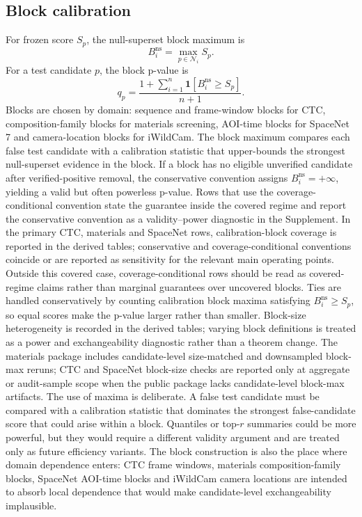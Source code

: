 \documentclass[10pt,twocolumn]{article}
\newcommand{\Ncal}{\mathcal N}
\newcommand{\ind}{\mathbf 1}
\begin{document}
\subsection{Block calibration}

For frozen score \(S_p\), the null-superset block maximum is
\[
  B_i^{\mathrm{ns}}=\max_{p\in\Ncal_i}S_p .
\]
For a test candidate \(p\), the block p-value is
\[
  q_p=\frac{1+\sum_{i=1}^n\ind[B_i^{\mathrm{ns}}\ge S_p]}{n+1}.
\]
Blocks are chosen by domain: sequence and frame-window blocks for CTC, composition-family blocks for materials screening, AOI-time blocks for SpaceNet 7 and camera-location blocks for iWildCam.
The block maximum compares each false test candidate with a calibration statistic that upper-bounds the strongest null-superset evidence in the block.
If a block has no eligible unverified candidate after verified-positive removal, the conservative convention assigns \(B_i^{\mathrm{ns}}=+\infty\), yielding a valid but often powerless p-value.
Rows that use the coverage-conditional convention state the guarantee inside the covered regime and report the conservative convention as a validity--power diagnostic in the Supplement.
In the primary CTC, materials and SpaceNet rows, calibration-block coverage is reported in the derived tables; conservative and coverage-conditional conventions coincide or are reported as sensitivity for the relevant main operating points.
Outside this covered case, coverage-conditional rows should be read as covered-regime claims rather than marginal guarantees over uncovered blocks.
Ties are handled conservatively by counting calibration block maxima satisfying \(B_i^{\mathrm{ns}}\ge S_p\), so equal scores make the p-value larger rather than smaller.
Block-size heterogeneity is recorded in the derived tables; varying block definitions is treated as a power and exchangeability diagnostic rather than a theorem change.
The materials package includes candidate-level size-matched and downsampled block-max reruns; CTC and SpaceNet block-size checks are reported only at aggregate or audit-sample scope when the public package lacks candidate-level block-max artifacts.
The use of maxima is deliberate.
A false test candidate must be compared with a calibration statistic that dominates the strongest false-candidate score that could arise within a block.
Quantiles or top-\(r\) summaries could be more powerful, but they would require a different validity argument and are treated only as future efficiency variants.
The block construction is also the place where domain dependence enters: CTC frame windows, materials composition-family blocks, SpaceNet AOI-time blocks and iWildCam camera locations are intended to absorb local dependence that would make candidate-level exchangeability implausible.
\end{document}
